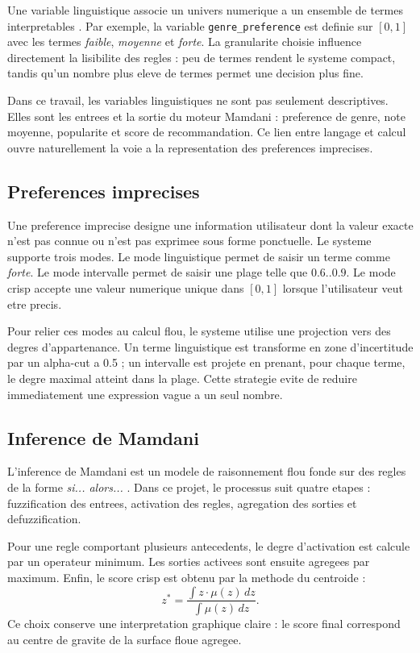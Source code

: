 Une variable linguistique associe un univers numerique a un ensemble de termes interpretables \cite{zadeh1975}. Par exemple, la variable \texttt{genre\_preference} est definie sur $[0,1]$ avec les termes \emph{faible}, \emph{moyenne} et \emph{forte}. La granularite choisie influence directement la lisibilite des regles : peu de termes rendent le systeme compact, tandis qu'un nombre plus eleve de termes permet une decision plus fine.

Dans ce travail, les variables linguistiques ne sont pas seulement descriptives. Elles sont les entrees et la sortie du moteur Mamdani : preference de genre, note moyenne, popularite et score de recommandation. Ce lien entre langage et calcul ouvre naturellement la voie a la representation des preferences imprecises.

\subsection{Preferences imprecises}

Une preference imprecise designe une information utilisateur dont la valeur exacte n'est pas connue ou n'est pas exprimee sous forme ponctuelle. Le systeme supporte trois modes. Le mode linguistique permet de saisir un terme comme \emph{forte}. Le mode intervalle permet de saisir une plage telle que $0.6..0.9$. Le mode crisp accepte une valeur numerique unique dans $[0,1]$ lorsque l'utilisateur veut etre precis.

Pour relier ces modes au calcul flou, le systeme utilise une projection vers des degres d'appartenance. Un terme linguistique est transforme en zone d'incertitude par un alpha-cut a 0.5 ; un intervalle est projete en prenant, pour chaque terme, le degre maximal atteint dans la plage. Cette strategie evite de reduire immediatement une expression vague a un seul nombre.

\subsection{Inference de Mamdani}

L'inference de Mamdani est un modele de raisonnement flou fonde sur des regles de la forme \emph{si... alors...} \cite{mamdani1975}. Dans ce projet, le processus suit quatre etapes : fuzzification des entrees, activation des regles, agregation des sorties et defuzzification.

Pour une regle comportant plusieurs antecedents, le degre d'activation est calcule par un operateur minimum. Les sorties activees sont ensuite agregees par maximum. Enfin, le score crisp est obtenu par la methode du centroide :
\[
z^*=\frac{\int z\cdot \mu(z)\,dz}{\int \mu(z)\,dz}.
\]
Ce choix conserve une interpretation graphique claire : le score final correspond au centre de gravite de la surface floue agregee.

